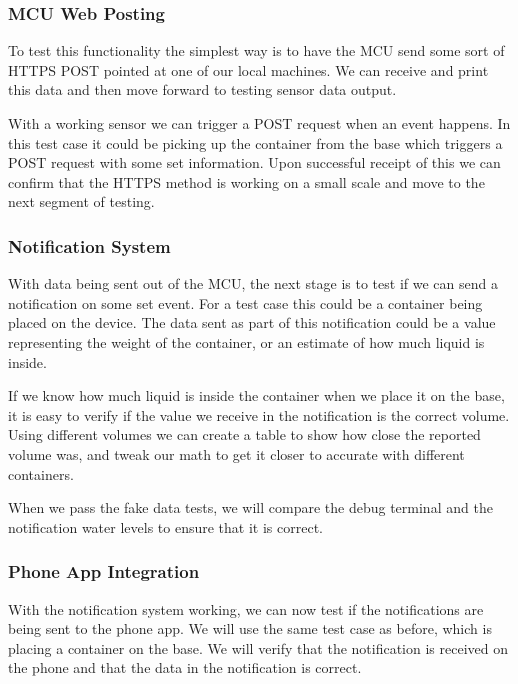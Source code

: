 \subsubsection*{MCU Web Posting}

To test this functionality the simplest way is to have the MCU send some sort of HTTPS POST pointed at one of our local machines. We can receive and print this data and then move forward to testing sensor data output. 

With a working sensor we can trigger a POST request when an event happens. In this test case it could be picking up the container from the base which triggers a POST request with some set information. Upon successful receipt of this we can confirm that the HTTPS method is working on a small scale and move to the next segment of testing. 

\subsubsection*{Notification System}

With data being sent out of the MCU, the next stage is to test if we can send a notification on some set event. For a test case this could be a container being placed on the device. The data sent as part of this notification could be a value representing the weight of the container, or an estimate of how much liquid is inside.

If we know how much liquid is inside the container when we place it on the base, it is easy to verify if the value we receive in the notification is the correct volume. Using different volumes we can create a table to show how close the reported volume was, and tweak our math to get it closer to accurate with different containers.

When we pass the fake data tests, we will compare the debug terminal and the notification water levels to ensure that it is correct.

\subsubsection*{Phone App Integration}

With the notification system working, we can now test if the notifications are being sent to the phone app. We will use the same test case as before, which is placing a container on the base. We will verify that the notification is received on the phone and that the data in the notification is correct.

